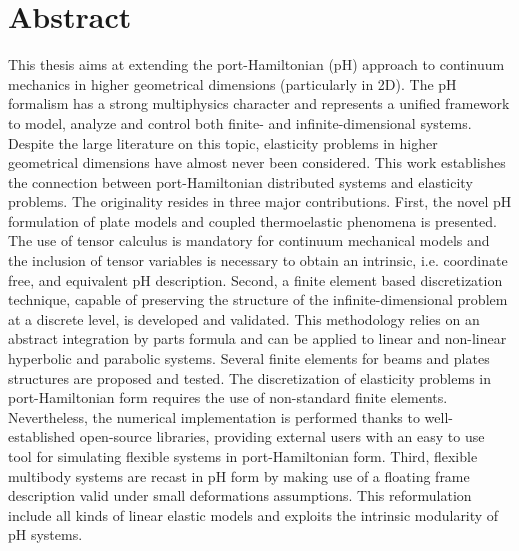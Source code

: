\chapter*{Abstract}

This thesis aims at extending the port-Hamiltonian (pH) approach to continuum mechanics in higher geometrical dimensions (particularly in 2D). The pH formalism has a strong multiphysics character and represents a unified framework to model, analyze and control both finite- and infinite-dimensional systems. Despite the large literature on this topic, elasticity problems in higher geometrical dimensions have almost never been considered.  This work establishes the connection between port-Hamiltonian distributed systems and elasticity problems. The originality resides in three major contributions. First, the novel pH formulation of plate models and coupled thermoelastic phenomena is presented. The use of tensor calculus is mandatory for continuum mechanical models and the inclusion of tensor variables is necessary to obtain an intrinsic, i.e. coordinate free, and equivalent pH description. Second, a finite element based discretization technique, capable of preserving the structure of the infinite-dimensional problem at a discrete level, is developed and validated. This methodology relies on an abstract integration by parts formula and can be applied to linear and non-linear hyperbolic and parabolic systems. Several finite elements for beams and plates structures are proposed and tested. The discretization of elasticity problems in port-Hamiltonian form requires the use of non-standard finite elements. Nevertheless, the numerical implementation is performed thanks to well-established open-source libraries, providing external users with an easy to use tool for simulating flexible systems in port-Hamiltonian form. Third, flexible multibody systems are recast in pH form by making use of a floating frame description valid under small deformations assumptions. This reformulation include all kinds of linear elastic models and exploits the intrinsic modularity of pH systems. 